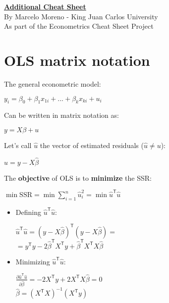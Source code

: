 \documentclass[10pt, a4paper, landscape]{extarticle}
\newcommand{\SSR}{\mathrm{SSR}}
\newcommand{\tr}{\mathsf{T}}
\begin{document}
\setlength{\footskip}{12pt}

\begin{multicols}{3} %
\begin{center}
	\textbf{\LARGE \href{https://github.com/marcelomijas/econometrics-cheatsheet}{Additional Cheat Sheet}} \\
	{\footnotesize By Marcelo Moreno - King Juan Carlos University} \\
	{\footnotesize As part of the Econometrics Cheat Sheet Project}
\end{center}
\section*{OLS matrix notation}
	The general econometric model:
	\begin{center}
		$y_i = \beta_0 + \beta_1 x_{1i} + ... + \beta_k x_{ki} + u_i$
	\end{center}
	Can be written in matrix notation as:
	\begin{center}
		$y = X \beta + u$
	\end{center}
	Let's call $\hat{u}$ the vector of estimated residuals ($\hat{u} \neq u$):
	\begin{center}
		$\hat{u} = y - X \hat{\beta}$
	\end{center}
	The \textbf{objective} of OLS is to \textbf{minimize} the SSR:
	\begin{center}
		$\min \SSR = \min \sum_{i=1}^n \hat{u}_i^2 = \min \hat{u}^\tr \hat{u}$
	\end{center}
	\begin{itemize}[leftmargin=*]
		\item Defining $\hat{u}^\tr \hat{u}$:
		\begin{center}
			$\hat{u}^\tr \hat{u} = (y - X \hat{\beta})^\tr (y - X \hat{\beta}) =$ \\
			$= y^\tr y -2 \hat{\beta}^\tr X^\tr y + \hat{\beta}^\tr X^\tr X \hat{\beta}$
		\end{center}
		\item Minimizing $\hat{u}^\tr \hat{u}$:
		\begin{center}
			$\frac{\partial \hat{u}^\tr \hat{u}}{\partial \hat{\beta}} = -2 X^\tr y +2 X^\tr X \hat{\beta} = 0$ \\
			$\hat{\beta} = (X^\tr X)^{-1} (X^\tr y)$ \\

\end{center}
\end{itemize}
\end{multicols}
\end{document}
